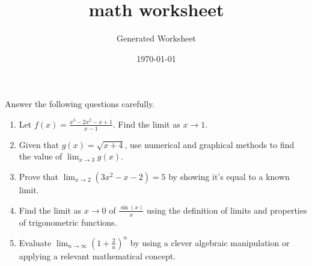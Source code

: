 \documentclass{article}
\begin{document}
\title{ math worksheet }
\author{Generated Worksheet}
\date{\today}

\maketitle

Answer the following questions carefully.

\begin{enumerate}
Here are five math questions about limits at a hard difficulty level for grade 12 students: \item Let $ f(x) = \frac{x^3 - 2x^2 - x + 1}{x-1} $. Find the limit as $ x \to 1 $. \item Given that $ g(x) = \sqrt{x+4} $, use numerical and graphical methods to find the value of $ \lim_{x\to3}g(x) $. \item Prove that $ \lim_{x\to2}(3x^2-x-2)=5 $ by showing it's equal to a known limit. \item Find the limit as $ x \to 0 $ of $ \frac{\sin(x)}{x} $ using the definition of limits and properties of trigonometric functions. \item Evaluate $ \lim_{n\to\infty}\left(1+\frac{2}{n}\right)^n $ by using a clever algebraic manipulation or applying a relevant mathematical concept.
\end{enumerate}
\end{document}
